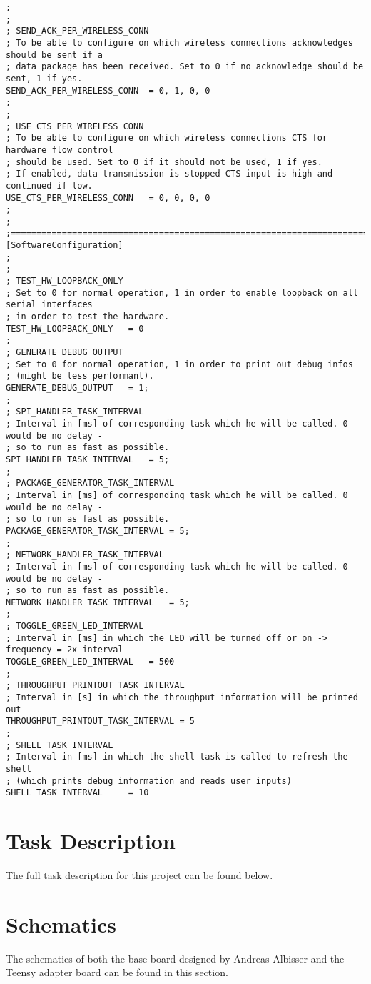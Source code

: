 \begin{lstlisting}
;
;
; SEND_ACK_PER_WIRELESS_CONN
; To be able to configure on which wireless connections acknowledges should be sent if a 
; data package has been received. Set to 0 if no acknowledge should be sent, 1 if yes.
SEND_ACK_PER_WIRELESS_CONN	= 0, 1, 0, 0
;
;
; USE_CTS_PER_WIRELESS_CONN
; To be able to configure on which wireless connections CTS for hardware flow control 
; should be used. Set to 0 if it should not be used, 1 if yes.
; If enabled, data transmission is stopped CTS input is high and continued if low.
USE_CTS_PER_WIRELESS_CONN	= 0, 0, 0, 0
;
;
;========================================================================================
[SoftwareConfiguration]
;
;
; TEST_HW_LOOPBACK_ONLY
; Set to 0 for normal operation, 1 in order to enable loopback on all serial interfaces 
; in order to test the hardware.
TEST_HW_LOOPBACK_ONLY	= 0
;
; GENERATE_DEBUG_OUTPUT
; Set to 0 for normal operation, 1 in order to print out debug infos 
; (might be less performant).
GENERATE_DEBUG_OUTPUT	= 1;
;
; SPI_HANDLER_TASK_INTERVAL
; Interval in [ms] of corresponding task which he will be called. 0 would be no delay - 
; so to run as fast as possible.
SPI_HANDLER_TASK_INTERVAL	= 5;
;
; PACKAGE_GENERATOR_TASK_INTERVAL
; Interval in [ms] of corresponding task which he will be called. 0 would be no delay - 
; so to run as fast as possible.
PACKAGE_GENERATOR_TASK_INTERVAL	= 5;
;
; NETWORK_HANDLER_TASK_INTERVAL
; Interval in [ms] of corresponding task which he will be called. 0 would be no delay - 
; so to run as fast as possible.
NETWORK_HANDLER_TASK_INTERVAL	= 5;
;
; TOGGLE_GREEN_LED_INTERVAL
; Interval in [ms] in which the LED will be turned off or on -> frequency = 2x interval
TOGGLE_GREEN_LED_INTERVAL	= 500
;
; THROUGHPUT_PRINTOUT_TASK_INTERVAL
; Interval in [s] in which the throughput information will be printed out
THROUGHPUT_PRINTOUT_TASK_INTERVAL = 5
;
; SHELL_TASK_INTERVAL
; Interval in [ms] in which the shell task is called to refresh the shell 
; (which prints debug information and reads user inputs)
SHELL_TASK_INTERVAL		= 10
\end{lstlisting}
%
%
%
%
\chapter{Task Description} \label{app:Aufgabenstellung}
The full task description for this project can be found below.

%
%
%
%
\chapter{Schematics} \label{app:Schematics}
The schematics of both the base board designed by Andreas Albisser and the Teensy adapter board can be found in this section.


%
%
%
%
